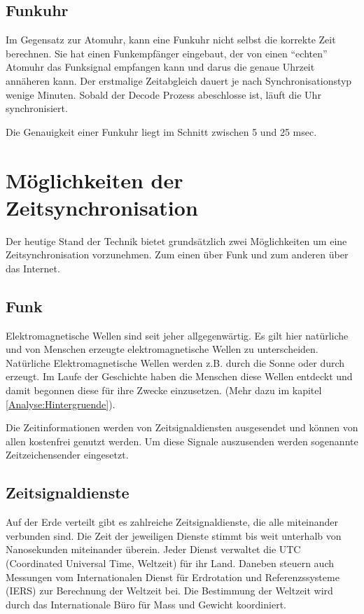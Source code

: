 \subsection{Funkuhr}
Im Gegensatz zur Atomuhr, kann eine Funkuhr nicht selbst die korrekte Zeit berechnen. Sie hat einen Funkempfänger eingebaut, der von einen "`echten"' Atomuhr das Funksignal empfangen kann und darus die genaue Uhrzeit annäheren kann. Der erstmalige Zeitabgleich dauert je nach Synchronisationstyp wenige Minuten. Sobald der Decode Prozess abeschlosse ist, läuft die Uhr synchronisiert.

Die Genauigkeit einer Funkuhr liegt im Schnitt zwischen 5 und 25 msec.


\section{Möglichkeiten der Zeitsynchronisation}
Der heutige Stand der Technik bietet grundsätzlich zwei Möglichkeiten um eine Zeitsynchronisation vorzunehmen. Zum einen über Funk und zum anderen über das Internet.

\subsection{Funk}
Elektromagnetische Wellen sind seit jeher allgegenwärtig. Es gilt hier natürliche und von Menschen erzeugte elektromagnetische Wellen zu unterscheiden. Natürliche Elektromagnetische Wellen werden z.B. durch die Sonne oder durch erzeugt. Im Laufe der Geschichte haben die Menschen diese Wellen entdeckt und damit begonnen diese für ihre Zwecke einzusetzen. (Mehr dazu im kapitel \ref{Analyse:Hintergruende}).

Die Zeitinformationen werden von Zeitsignaldiensten ausgesendet und können von allen kostenfrei genutzt werden. Um diese Signale auszusenden werden sogenannte Zeitzeichensender eingesetzt. 

\subsection{Zeitsignaldienste}
Auf der Erde verteilt gibt es zahlreiche Zeitsignaldienste, die alle miteinander verbunden sind. Die Zeit der jeweiligen Dienste stimmt bis weit unterhalb von Nanosekunden miteinander überein. Jeder Dienst verwaltet die UTC (Coordinated Universal Time, Weltzeit) für ihr Land. Daneben steuern auch Messungen vom Internationalen Dienst für Erdrotation und Referenzssysteme (IERS) zur Berechnung der Weltzeit bei.
Die Bestimmung der Weltzeit wird durch das Internationale Büro für Mass und Gewicht koordiniert. 

